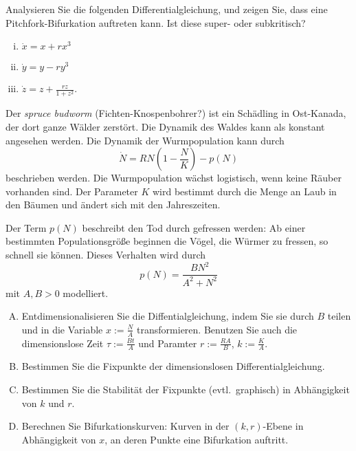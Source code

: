 \documentclass[11pt,a4paper]{article}
\begin{document}




\begin{aufg}
 Analysieren Sie die folgenden Differentialgleichung, und zeigen Sie, dass eine
 Pitchfork-Bifurkation auftreten kann. Ist diese super- oder subkritisch?
 \begin{enumerate}[(i)]
  \item $\dot{x} = x + rx^3$
  \item $\dot{y} = y - ry^3$
  \item $\dot{z} = z + \tfrac{rz}{1+z^2}$.
 \end{enumerate}
\end{aufg}

\bigskip%

\begin{aufg}[Insektenplage]
Der \emph{spruce budworm} (Fichten-Knospenbohrer?) ist ein Schädling in
Ost-Kanada, der dort ganze Wälder zerstört. Die Dynamik des Waldes kann als
konstant angesehen werden. Die Dynamik der Wurmpopulation kann durch
\begin{equation*}
 \dot{N} = RN \left( 1- \frac{N}{K} \right) - p(N)
\end{equation*}
beschrieben werden.
Die Wurmpopulation wächst logistisch, wenn keine Räuber vorhanden sind. Der
Parameter $K$ wird bestimmt durch die Menge an Laub in den Bäumen und ändert sich
mit den Jahreszeiten.

Der Term $p(N)$ beschreibt den Tod durch \glqq{}gefressen
werden\grqq{}: Ab einer bestimmten Populationsgröße beginnen die Vögel, die
Würmer zu fressen, so schnell sie können. Dieses Verhalten wird durch
\begin{equation*}
 p(N) = \frac{BN^2}{A^2 + N^2}
\end{equation*}
mit $A,B>0$ modelliert.

\begin{enumerate}[A)]
 \item Entdimensionalisieren Sie die Diffentialgleichung, indem Sie sie durch
       $B$ teilen und in die Variable $x:=\tfrac{N}{A}$ transformieren.
       Benutzen Sie auch die dimensionslose Zeit $\tau:=\tfrac{Bt}{A}$ und
       Paramter $r:=\tfrac{RA}{B}$, $k:=\tfrac{K}{A}$.
 \item Bestimmen Sie die Fixpunkte der dimensionslosen Differentialgleichung.
 \item Bestimmen Sie die Stabilität der Fixpunkte (evtl.\ graphisch)
       in Abhängigkeit von $k$ und $r$.
 \item Berechnen Sie Bifurkationskurven: Kurven in der $(k,r)$-Ebene in Abhängigkeit
       von $x$, an deren Punkte eine Bifurkation auftritt.
\end{enumerate}
\end{aufg}
\end{document}
